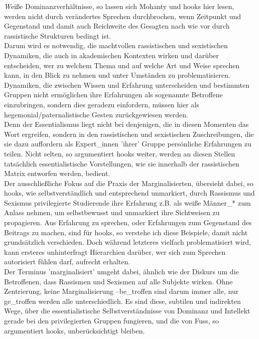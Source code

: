 \noindent \textit{W}eiße Dominanzverhältnisse, so lassen sich Mohanty und hooks hier lesen, werden
nicht durch verändertes Sprechen durchbrochen, wenn Zeitpunkt und Gegenstand
und damit auch Reichweite des Gesagten nach wie vor durch rassistische
Strukturen bedingt ist.\\
Darum wird es notwendig, die machtvollen rassistischen und sexistischen
Dynamiken, die auch in akademischen Kontexten wirken und darüber entscheiden,
wer zu welchem Thema und auf welche Art und Weise sprechen kann, in den Blick
zu nehmen und unter Umständen zu problematisieren. Dynamiken, die zwischen
Wissen und Erfahrung unterscheiden und bestimmten Gruppen nicht ermöglichen
ihre Erfahrungen als sogenannte Betroffene einzubringen, sondern dies geradezu
einfordern, müssen hier als hegemonial/paternalistische Gesten zurückgewiesen
werden.\\
Denn der Essentialismus liegt nicht bei denjenigen, die in diesen Momenten das
Wort ergreifen, sondern in den rassistischen und sexistischen Zuschreibungen,
die sie dazu auffordern als Expert\_innen 'ihrer' Gruppe persönliche Erfahrungen
zu teilen. Nicht selten, so argumentiert hooks weiter, werden an diesen Stellen
tatsächlich essentialistische Vorstellungen, wie sie innerhalb der
rassistischen Matrix entworfen werden,
bedient.\footnotemark{}\\

\noindent Der ausschließliche Fokus auf die Praxis der Marginalisierten, übersieht dabei,
so hooks, wie selbstverständlich und entsprechend unmarkiert, durch Rassismus
und Sexismus privilegierte Studierende ihre Erfahrung z.B. als weiße Männer\_*
zum Anlass nehmen, um selbstbewusst und unmarkiert ihre Sichtweisen zu
propagieren. Aus Erfahrung zu sprechen, oder Erfahrungen zum Gegenstand des
Beitrags zu machen, sind für hooks, so verstehe ich diese Beispiele, damit
nicht grundsätzlich verschieden. Doch während letzteres vielfach
problematisiert wird, kann ersteres unhinterfragt Hierarchien darüber, wer sich
zum Sprechen autorisiert fühlen darf, aufrecht
erhalten.\footnotemark{}\\
Der Terminus 'marginalisiert' umgeht dabei, ähnlich wie der Diskurs um die
Betroffenen, dass Rassismen und Sexismen auf alle Subjekte wirken. Ohne
Zentrierung, keine Marginalisierung –be\_troffen sind darum immer alle, nur
ge\_troffen werden alle unterschiedlich.  Es sind diese, subtilen und indirekten
Wege, über die essentialistische Selbstverständnisse von Dominanz und Intellekt
gerade bei den privilegierten Gruppen fungieren, und die von Fuss, so
argumentiert hooks, unberücksichtigt bleiben.\\

